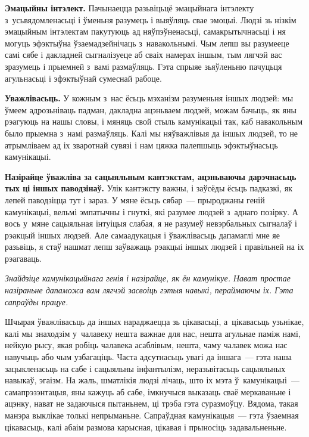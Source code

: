 \textbf{Эмацыйны інтэлект.} Пачынаецца разьвіцьцё эмацыйнага інтэлекту з~усьвядомленасьці і ўменьня разумець і выяўляць свае эмоцыі. Людзі зь нізкім эмацыйным інтэлектам пакутуюць ад няўпэўненасьці, самакрытычнасьці і ня могуць эфэктыўна ўзаемадзейнічаць з~навакольнымі. Чым лепш вы разумееце самі сябе і дакладней сыгналізуеце аб сваіх намерах іншым, тым лягчэй вас зразумець і прыемней з~вамі размаўляць. Гэта спрыяе зьяўленьню пачуцьця агульнасьці і эфэктыўнай сумеснай рабоце.


\textbf{Уважлівасьць.} У кожным з~нас ёсьць мэханізм разуменьня іншых людзей: мы ўмеем адрозьніваць падман, дакладна ацэньваем людзей, можам бачыць, як яны рэагуюць на нашы словы, і мяняць свой стыль камунікацыі так, каб навакольным было прыемна з~намі размаўляць. Калі мы няўважлівыя да іншых людзей, то не атрымліваем ад іх зваротнай сувязі і нам цяжка палепшыць эфэктыўнасьць камунікацыі. 

\textbf{Назірайце ўважліва за сацыяльным кантэкстам, ацэньваючы дарэчнасьць тых ці іншых паводзінаў.} Улік кантэксту важны, і заўсёды ёсьць падказкі, як лепей паводзіцца тут і зараз. У мяне ёсьць сябар~--- прыроджаны геній камунікацыі, вельмі эмпатычны і гнуткі, які разумее людзей з~аднаго позірку. А вось у~мяне сацыяльная інтуіцыя слабая, я не разумеў невэрбальных сыгналаў і рэакцый іншых людзей. Але самаадукацыя і ўважлівасьць дапамаглі мне яе разьвіць, я стаў нашмат лепш заўважаць рэакцыі іншых людзей і правільней на іх рэагаваць.

\emph{Знайдзіце камунікацыйнага генія і назірайце, як ён камунікуе. Нават простае назіраньне дапаможа вам лягчэй засвоіць гэтыя навыкі, пераймаючы іх. Гэта сапраўды працуе.}

Шчырая ўважлівасьць да іншых нараджаецца зь цікавасьці, а~цікавасьць узьнікае, калі мы знаходзім у~чалавеку нешта важнае для нас, нешта агульнае паміж намі, нейкую рысу, якая робіць чалавека асаблівым, нешта, чаму чалавек можа нас навучыць або чым узбагаціць. Часта адсутнасьць увагі да іншага~--- гэта наша зацыкленасьць на сабе і сацыяльны інфантылізм, неразьвітасьць сацыяльных навыкаў, эгаізм. На жаль, шматлікія людзі лічаць, што іх мэта ў~камунікацыі~--- самапрэзэнтацыя, яны кажуць аб сабе, імкнучыся выказаць сваё меркаваньне і ацэнку, нават не задаючыся пытаньнем, ці трэба гэта суразмоўцу. Вядома, такая манэра выклікае толькі непрыманьне. Сапраўдная камунікацыя~--- гэта ўзаемная цікавасьць, калі абаім размова карысная, цікавая і прыносіць задавальненьне.

